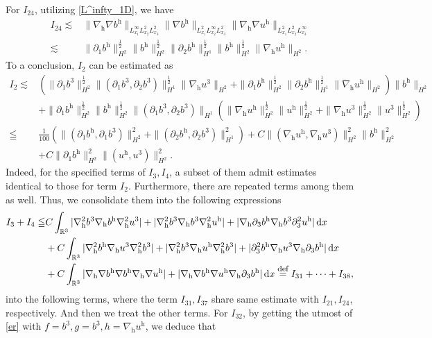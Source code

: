\documentclass[11pt]{amsart}
\theoremstyle{definition}
\newcommand{\R}{\mathbb{R}}
\newcommand{\h}{\mathrm{h}}
\def\eqdefa{\buildrel\hbox{\footnotesize def}\over =}
\newcommand{\dx}{\,{\rm d}x}
\newcommand{\nablah}{\nabla_{\mathrm{h}}}
\numberwithin{equation}{section}
\begin{document}
For $I_{24}$, utilizing \eqref{L^infty_1D}, we have
\begin{align*}
	I_{24}\lesssim&\|\nablah\nabla b^\h\|_{L^\infty_{x_1}L^2_{x_2}L^2_{x_3}}\|\nabla b^\h \|_{L^2_{x_1}L^\infty_{x_2}L^2_{x_3}}\|\nablah \nabla u^\h\|_{L^2_{x_1}L^2_{x_2}L^\infty_{x_3}}\\
	\lesssim&\|\partial_1b^\h\|_{H^2}^\frac12\|b^\h\|_{H^2}^\frac12\|\partial_2b^\h\|_{H^1}^\frac12\|b^\h\|_{H^2}^\frac12\|\nablah u^\h\|_{H^2}.
\end{align*}
To a conclusion, $I_{2}$ can be estimated as
\begin{align}\label{I_2}
	I_2\lesssim& \left(\|\partial_1b^3\|_{H^2}^\frac12\|(\partial_1b^3,\partial_2b^3)\|_{H^1}^\frac12\|\nablah u^3\|_{H^2}+\|\partial_1b^\h\|_{H^2}^\frac12\|\partial_2b^\h\|_{H^1}^\frac12\|\nablah u^\h\|_{H^2}\right)\|b^\h\|_{H^2}\nonumber\\
	&+\|\partial_1b^\h\|_{H^2}^\frac12\|b^\h\|_{H^2}^\frac12\|(\partial_1b^3,\partial_2b^3)\|_{H^1}\left(\|\nablah u^\h\|_{H^2}^\frac12\|u^\h\|_{H^2}^\frac12+\|\nablah u^3\|_{H^2}^\frac12\|u^3\|_{H^2}^\frac12\right)\nonumber\\
	\leqq&\frac{1}{100}\left(\|(\partial_1b^\h,\partial_1b^3)\|_{H^2}^2+\|(\partial_2b^\h,\partial_2b^3)\|_{H^1}^2\right)+C\|(\nablah u^\h,\nablah u^3)\|_{H^2}^2\|b^\h\|_{H^2}^2\nonumber\\
	&+C\|\partial_1b^\h\|_{H^2}^2\|(u^\h,u^3)\|_{H^2}^2.
\end{align}
Indeed, for the specified terms of $I_{3},I_{4}$, a subset of them admit estimates identical to those for term $I_{2}$. Furthermore, there are repeated terms among them as well. Thus, we consolidate them into the following expressions
\begin{align*}
	I_{3}+I_{4}\leqq &C\int_{\R^3}|\nablah^2b^3\nablah b^\h \nablah^2 u^3|+|\nablah^2b^3\nablah b^3 \nablah^2 u^\h|+|\nablah\partial_3b^\h\nablah b^3 \partial_3^2 u^\h|\dx\\
	&+C\int_{\R^3}|\nablah^2b^\h \nablah u^3\nablah^2 b^3|+|\nablah^2b^3\nablah u^\h\nablah^2 b^3 |+|\partial_3^2b^\h\nablah u^3\nablah\partial_3b^\h|\dx
	\\
	&+C\int_{\R^3}|\nablah\nabla b^\h\nabla b^\h \nablah \nabla u^\h|+|\nablah\nabla b^\h\nabla u^\h\nablah\partial_3 b^\h  |\dx\eqdefa I_{31}+\cdots +I_{38},
\end{align*}
into the following terms, where the term $I_{31},I_{37}$ share same estimate with $I_{21},I_{24}$, respectively. And then we treat the other terms. For $I_{32}$, by getting the utmost of \eqref{er} with $f=b^3, g=b^3, h=\nablah u^\h$, we deduce that
\end{document}
